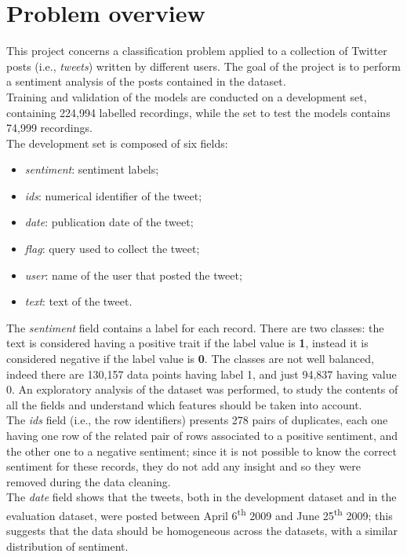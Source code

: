 \documentclass[conference]{IEEEtran}
\begin{document}
\section{Problem overview}
This project concerns a classification problem applied to a collection of Twitter posts (i.e., \textit{tweets}) written by different users. The goal of the project is to perform a sentiment analysis of the posts contained in the dataset.\\
Training and validation of the models are conducted on a development set, containing 224,994 labelled recordings, while the set to test the models contains 74,999 recordings.\\
The development set is composed of six fields:
\begin{itemize}
    \item \textit{sentiment}: sentiment labels;
    \item \textit{ids}: numerical identifier of the tweet;
    \item \textit{date}: publication date of the tweet;
    \item \textit{flag}: query used to collect the tweet;
    \item \textit{user}: name of the user that posted the tweet;
    \item \textit{text}: text of the tweet. 
\end{itemize}
The \textit{sentiment} field contains a label for each record. There are two classes: the text is considered having a positive trait if the label value is \textbf{1}, instead it is considered negative if the label value is \textbf{0}. The classes are not well balanced, indeed there are 130,157 data points having label 1, and just 94,837 having value 0. An exploratory analysis of the dataset was performed, to study the contents of all the fields and understand which features should be taken into account.\\
The \textit{ids} field (i.e., the row identifiers) presents 278 pairs of duplicates, each one having one row of the related pair of rows associated to a positive sentiment, and the other one to a negative sentiment; since it is not possible to know the correct sentiment for these records, they do not add any insight and so they were removed during the data cleaning. \\
The \textit{date} field shows that the tweets, both in the development dataset and in the evaluation dataset, were posted between April 6\textsuperscript{th} 2009 and June 25\textsuperscript{th} 2009; this suggests that the data should be homogeneous across the datasets, with a similar distribution of sentiment. \\
\end{document}
